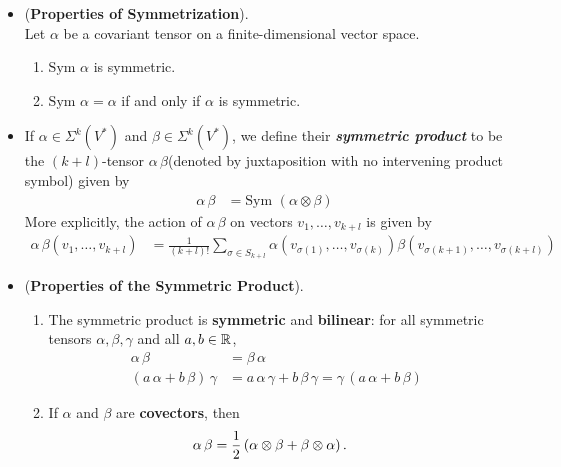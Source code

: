 \documentclass[11pt]{article}
\begin{document}
\begin{itemize}
\item \begin{proposition} (\textbf{Properties of Symmetrization}).\\
 Let $\alpha$ be a covariant tensor on a finite-dimensional vector space.
 \begin{enumerate}
 \item $\text{Sym }\alpha $ is symmetric.
 \item $\text{Sym }\alpha = \alpha$ if and only if $\alpha$ is symmetric.
 \end{enumerate}
\end{proposition}

\item \begin{definition}
If $\alpha \in \Sigma^{k}(V^{*})$ and $\beta \in \Sigma^{k}(V^{*})$, we define their \emph{\textbf{symmetric product}} to be the $(k + l)$-tensor $\alpha\,\beta$(denoted by juxtaposition with no intervening product symbol) given by
\begin{align*}
\alpha\,\beta &= \text{Sym }(\alpha \otimes \beta)
\end{align*}
More explicitly, the action of $\alpha\,\beta$ on vectors $v_1,\ldots,v_{k+l}$ is given by
\begin{align*}
\alpha\,\beta(v_1,\ldots,v_{k+l}) &= \frac{1}{(k+l)!}\sum_{\sigma \in S_{k+l}}\alpha(v_{\sigma(1)},\ldots,v_{\sigma(k)})\beta(v_{\sigma(k+1)},\ldots,v_{\sigma(k+l)})
\end{align*}
\end{definition}

\item \begin{proposition} (\textbf{Properties of the Symmetric Product}).\\
\begin{enumerate}
\item The symmetric product is \textbf{symmetric} and \textbf{bilinear}: for all symmetric tensors $\alpha, \beta, \gamma$ and all $a, b \in {\mathbb R}$,
\begin{align*}
\alpha\, \beta &= \beta\, \alpha \\
(a\,\alpha + b\,\beta)\,\gamma &= a\,\alpha\,\gamma + b\,\beta\,\gamma = \gamma\, (a\,\alpha + b\,\beta)
\end{align*}
\item  If $\alpha$ and $\beta$ are \textbf{covectors}, then
\begin{align*}
\alpha\,\beta &=\frac{1}{2}\left(\alpha \otimes \beta + \beta \otimes \alpha\right).
\end{align*}
\end{enumerate}
\end{proposition}
\end{itemize}
\end{document}
